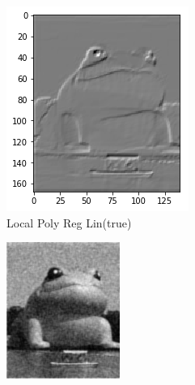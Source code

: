 \documentclass{article}
\begin{document}
\begin{figure}[htb]
\begin{subfigure}[b]{0.24\linewidth}
    \includegraphics[width=\linewidth]{images/poly_nr_lin.png}
    \caption{Local Poly Reg Lin(true)}
  \end{subfigure}
  \begin{subfigure}[b]{0.24\linewidth}
    \includegraphics[width=\linewidth]{images/poly_nr_true.png}

\end{subfigure}
\end{figure}
\end{document}

